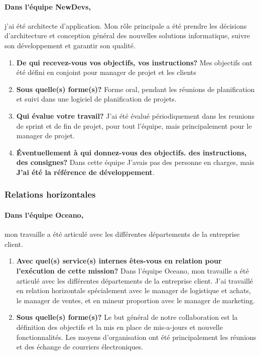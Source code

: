 \documentclass{resume} %
\begin{document}
		\paragraph{Dans l'équipe NewDevs,} j'ai été architecte d'application. Mon rôle principale a été prendre les décisions d'architecture et conception général des nouvelles solutions informatique, suivre son développement et garantir son qualité. 
		
		\begin{enumerate}
		\item \textbf{De qui recevez-vous vos objectifs, vos instructions?}
			Mes objectifs ont été défini en conjoint pour manager de projet et les clients
		\item \textbf{Sous quelle(s) forme(s)?}
			Forme oral, pendant les réunions de planification et suivi dans une logiciel de planification de projets.
		\item \textbf{Qui évalue votre travail?}
			J'ai été évalué périodiquement dans les reunions de sprint et de fin de projet, pour tout l'équipe, mais principalement pour le manager de projet. 
		\item  \textbf{Éventuellement à qui donnez-vous des objectifs. des instructions, des consignes?}
			Dans cette équipe J'avais pas des  personne en charges, mais \textbf{J'ai été la référence de développement}.
		\end{enumerate}
		
					
	\subsubsection{Relations horizontales}
	
	
		\paragraph{Dans l'équipe Oceano,} mon travaille a été articulé avec les différentes départements de la entreprise client.
		
		\begin{enumerate}
		\item \textbf{Avec quel(s) service(s) internes êtes-vous en relation pour l'exécution de cette mission?}
			Dans l'équipe Oceano, mon travaille a été articulé  avec  les différentes départements de la entreprise client. 
			J'ai travaillé en relation horizontale spécialement avec le manager de logistique et achats, 
			le manager de ventes, et en mineur proportion avec le manager de marketing. 

		\item \textbf{Sous quelle(s) forme(s)?}
			Le but général de notre collaboration est la définition des objectifs et la mis en place de mis-a-jours et nouvelle fonctionnalités. 
			Les moyens d'organisation ont été principalement les réunions et des échange de courriers électroniques. 
		\end {enumerate}	
		
\end{document}
